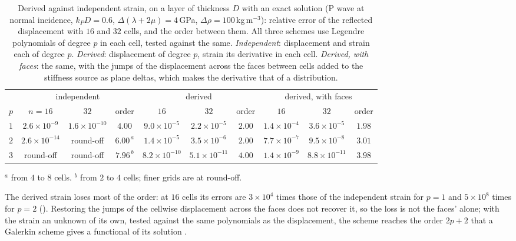 \documentclass[11pt,a4paper]{article}
\begin{document}
\begin{table}[htbp]
\centering
\caption{Derived against independent strain, on a layer of thickness $D$ with an exact solution (P wave at
normal incidence, $k_PD=0.6$, $\Delta(\lambda+2\mu)=4$\,GPa, $\Delta\rho=100$\,kg\,m$^{-3}$): relative error of
the reflected displacement with $16$ and $32$ cells, and the order between them. All three schemes use
Legendre polynomials of degree $p$ in each cell, tested against the same. \emph{Independent}: displacement
and strain each of degree $p$. \emph{Derived}: displacement of degree $p$, strain its derivative in each cell.
\emph{Derived, with faces}: the same, with the jumps of the displacement across the faces between cells added
to the stiffness source as plane deltas, which makes the derivative that of a distribution.}\label{tab:strainlayer}
\small
\begin{tabular}{@{}lccccccccc@{}}
\toprule
 & \multicolumn{3}{c}{independent} & \multicolumn{3}{c}{derived} & \multicolumn{3}{c}{derived, with faces} \\
\cmidrule(lr){2-4}\cmidrule(lr){5-7}\cmidrule(l){8-10}
$p$ & $n=16$ & $32$ & order & $16$ & $32$ & order & $16$ & $32$ & order \\
\midrule
$1$ & $2.6\times10^{-9}$ & $1.6\times10^{-10}$ & $4.00$ & $9.0\times10^{-5}$ & $2.2\times10^{-5}$ & $2.00$ &
$1.4\times10^{-4}$ & $3.6\times10^{-5}$ & $1.98$ \\
$2$ & $2.6\times10^{-14}$ & round-off & $6.00^{\,a}$ & $1.4\times10^{-5}$ & $3.5\times10^{-6}$ & $2.00$ &
$7.7\times10^{-7}$ & $9.5\times10^{-8}$ & $3.01$ \\
$3$ & round-off & round-off & $7.96^{\,b}$ & $8.2\times10^{-10}$ & $5.1\times10^{-11}$ & $4.00$ &
$1.4\times10^{-9}$ & $8.8\times10^{-11}$ & $3.98$ \\
\bottomrule
\end{tabular}

\smallskip
{\footnotesize $^a$ from $4$ to $8$ cells. $^b$ from $2$ to $4$ cells; finer grids are at round-off.}
\end{table}

The derived strain loses most of the order: at $16$ cells its errors are $3\times10^4$ times those of the
independent strain for $p=1$ and $5\times10^8$ times for $p=2$
(). Restoring the jumps of the cellwise displacement across the faces does not recover
it, so the loss is not the faces' alone; with the strain an unknown of its own, tested against the same
polynomials as the displacement, the scheme reaches the order $2p+2$ that a Galerkin scheme gives a
functional of its solution \citep{NestorError2026}.
\end{document}
